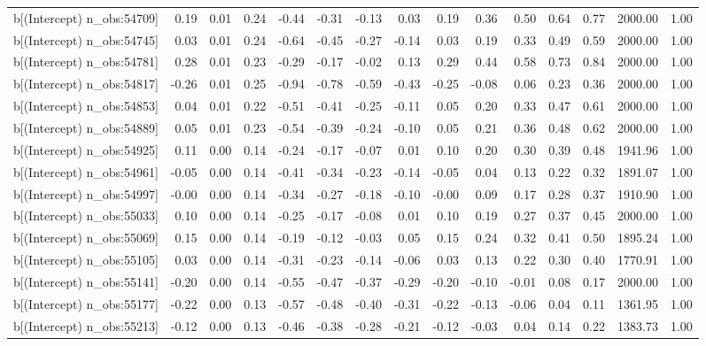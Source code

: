 \begin{table}[ht]
\begin{tabular}{rrrrrrrrrrrrrrr}
  b[(Intercept) n\_obs:54709] & 0.19 & 0.01 & 0.24 & -0.44 & -0.31 & -0.13 & 0.03 & 0.19 & 0.36 & 0.50 & 0.64 & 0.77 & 2000.00 & 1.00 \\ 
  b[(Intercept) n\_obs:54745] & 0.03 & 0.01 & 0.24 & -0.64 & -0.45 & -0.27 & -0.14 & 0.03 & 0.19 & 0.33 & 0.49 & 0.59 & 2000.00 & 1.00 \\ 
  b[(Intercept) n\_obs:54781] & 0.28 & 0.01 & 0.23 & -0.29 & -0.17 & -0.02 & 0.13 & 0.29 & 0.44 & 0.58 & 0.73 & 0.84 & 2000.00 & 1.00 \\ 
  b[(Intercept) n\_obs:54817] & -0.26 & 0.01 & 0.25 & -0.94 & -0.78 & -0.59 & -0.43 & -0.25 & -0.08 & 0.06 & 0.23 & 0.36 & 2000.00 & 1.00 \\ 
  b[(Intercept) n\_obs:54853] & 0.04 & 0.01 & 0.22 & -0.51 & -0.41 & -0.25 & -0.11 & 0.05 & 0.20 & 0.33 & 0.47 & 0.61 & 2000.00 & 1.00 \\ 
  b[(Intercept) n\_obs:54889] & 0.05 & 0.01 & 0.23 & -0.54 & -0.39 & -0.24 & -0.10 & 0.05 & 0.21 & 0.36 & 0.48 & 0.62 & 2000.00 & 1.00 \\ 
  b[(Intercept) n\_obs:54925] & 0.11 & 0.00 & 0.14 & -0.24 & -0.17 & -0.07 & 0.01 & 0.10 & 0.20 & 0.30 & 0.39 & 0.48 & 1941.96 & 1.00 \\ 
  b[(Intercept) n\_obs:54961] & -0.05 & 0.00 & 0.14 & -0.41 & -0.34 & -0.23 & -0.14 & -0.05 & 0.04 & 0.13 & 0.22 & 0.32 & 1891.07 & 1.00 \\ 
  b[(Intercept) n\_obs:54997] & -0.00 & 0.00 & 0.14 & -0.34 & -0.27 & -0.18 & -0.10 & -0.00 & 0.09 & 0.17 & 0.28 & 0.37 & 1910.90 & 1.00 \\ 
  b[(Intercept) n\_obs:55033] & 0.10 & 0.00 & 0.14 & -0.25 & -0.17 & -0.08 & 0.01 & 0.10 & 0.19 & 0.27 & 0.37 & 0.45 & 2000.00 & 1.00 \\ 
  b[(Intercept) n\_obs:55069] & 0.15 & 0.00 & 0.14 & -0.19 & -0.12 & -0.03 & 0.05 & 0.15 & 0.24 & 0.32 & 0.41 & 0.50 & 1895.24 & 1.00 \\ 
  b[(Intercept) n\_obs:55105] & 0.03 & 0.00 & 0.14 & -0.31 & -0.23 & -0.14 & -0.06 & 0.03 & 0.13 & 0.22 & 0.30 & 0.40 & 1770.91 & 1.00 \\ 
  b[(Intercept) n\_obs:55141] & -0.20 & 0.00 & 0.14 & -0.55 & -0.47 & -0.37 & -0.29 & -0.20 & -0.10 & -0.01 & 0.08 & 0.17 & 2000.00 & 1.00 \\ 
  b[(Intercept) n\_obs:55177] & -0.22 & 0.00 & 0.13 & -0.57 & -0.48 & -0.40 & -0.31 & -0.22 & -0.13 & -0.06 & 0.04 & 0.11 & 1361.95 & 1.00 \\ 
  b[(Intercept) n\_obs:55213] & -0.12 & 0.00 & 0.13 & -0.46 & -0.38 & -0.28 & -0.21 & -0.12 & -0.03 & 0.04 & 0.14 & 0.22 & 1383.73 & 1.00 \\ 

\end{tabular}
\end{table}
